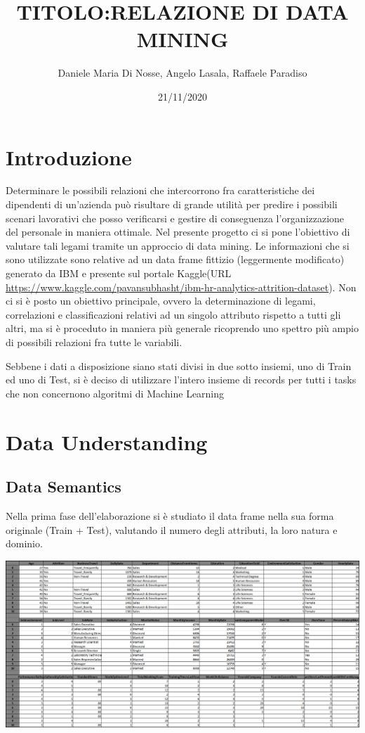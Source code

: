 \documentclass[english]{article}
\begin{document}
\title{TITOLO:RELAZIONE DI DATA MINING}
\author{Daniele Maria Di Nosse, Angelo Lasala, Raffaele Paradiso}
\date{21/11/2020\newpage}

\maketitle
\tableofcontents{}

\newpage

\section{Introduzione}
Determinare le possibili relazioni che intercorrono fra caratteristiche dei dipendenti di un'azienda può risultare di grande utilità per predire i possibili scenari lavorativi che posso verificarsi e gestire di conseguenza l'organizzazione del personale in maniera ottimale. Nel presente progetto ci si pone l'obiettivo di valutare tali legami tramite un approccio di data mining. Le informazioni che si sono utilizzate sono relative ad un data frame fittizio (leggermente modificato) generato da IBM e presente sul portale Kaggle(URL \url{https://www.kaggle.com/pavansubhasht/ibm-hr-analytics-attrition-dataset}). Non ci si è posto un obiettivo principale, ovvero la determinazione di legami, correlazioni e classificazioni relativi ad un singolo attributo rispetto a tutti gli altri, ma si è proceduto in maniera più generale ricoprendo uno spettro più ampio di possibili relazioni fra tutte le variabili.

Sebbene i dati a disposizione siano stati divisi in due sotto insiemi, uno di Train ed uno di Test, si è deciso di utilizzare l'intero insieme di records per tutti i tasks che non concernono algoritmi di Machine Learning
\section{Data Understanding}
\subsection{Data Semantics}
Nella prima fase dell'elaborazione si è studiato il data frame nella sua forma originale (Train + Test), valutando il numero degli attributi, la loro natura e dominio. 

\begin{center}
\includegraphics[scale=0.5]{DFhead(10).png}
\end{center}
\end{document}
